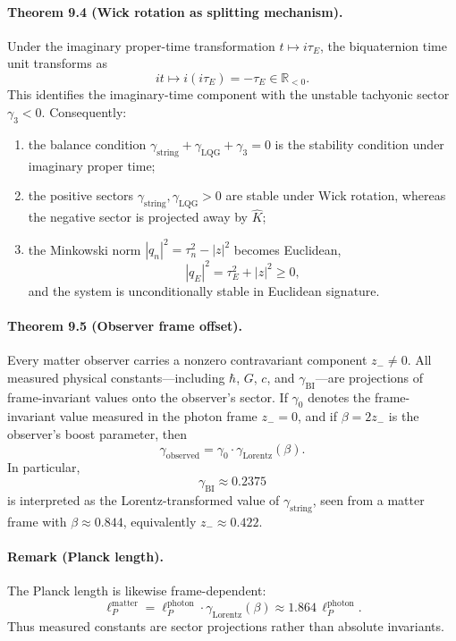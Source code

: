 \documentclass[12pt,a4paper]{article}
\begin{document}
\paragraph*{Theorem 9.4 (Wick rotation as splitting mechanism).}
Under the imaginary proper-time transformation $t \mapsto i\tau_E$, the biquaternion time unit transforms as
\[
it \mapsto i(i\tau_E) = -\tau_E \in \mathbb{R}_{<0}.
\]
This identifies the imaginary-time component with the unstable tachyonic sector $\gamma_3<0$. Consequently:
\begin{enumerate}
  \item the balance condition $\gamma_{\mathrm{string}}+\gamma_{\mathrm{LQG}}+\gamma_3=0$ is the stability condition under imaginary proper time;
  \item the positive sectors $\gamma_{\mathrm{string}}, \gamma_{\mathrm{LQG}}>0$ are stable under Wick rotation, whereas the negative sector is projected away by $\hat K$;
  \item the Minkowski norm $|q_n|^2=\tau_n^2-|z|^2$ becomes Euclidean,
  \[
  |q_E|^2 = \tau_E^2 + |z|^2 \ge 0,
  \]
  and the system is unconditionally stable in Euclidean signature.
\end{enumerate}

\paragraph*{Theorem 9.5 (Observer frame offset).}
Every matter observer carries a nonzero contravariant component $z_- \neq 0$. All measured physical constants---including $\hbar$, $G$, $c$, and $\gamma_{\mathrm{BI}}$---are projections of frame-invariant values onto the observer's sector. If $\gamma_0$ denotes the frame-invariant value measured in the photon frame $z_-=0$, and if $\beta=2z_-$ is the observer's boost parameter, then
\[
\gamma_{\mathrm{observed}} = \gamma_0 \cdot \gamma_{\mathrm{Lorentz}}(\beta).
\]
In particular,
\[
\gamma_{\mathrm{BI}} \approx 0.2375
\]
is interpreted as the Lorentz-transformed value of $\gamma_{\mathrm{string}}$, seen from a matter frame with $\beta \approx 0.844$, equivalently $z_- \approx 0.422$.

\paragraph*{Remark (Planck length).}
The Planck length is likewise frame-dependent:
\[
\ell_P^{\mathrm{matter}} = \ell_P^{\mathrm{photon}} \cdot \gamma_{\mathrm{Lorentz}}(\beta) \approx 1.864\, \ell_P^{\mathrm{photon}}.
\]
Thus measured constants are sector projections rather than absolute invariants.
\end{document}
